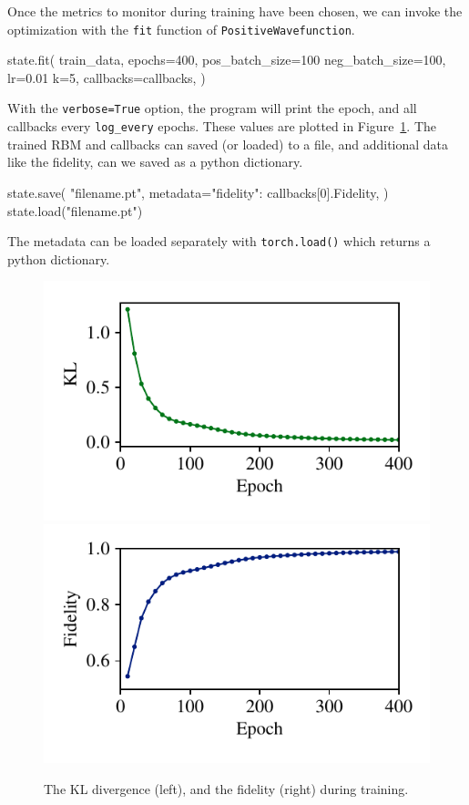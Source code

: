 \documentclass[submission, Phys]{SciPost}
\begin{document}
Once the metrics to monitor during training have been chosen, we can invoke the optimization with the \verb|fit| function of \verb|PositiveWavefunction|.


\begin{python}
state.fit(
    train_data,
    epochs=400,
    pos_batch_size=100
    neg_batch_size=100,
    lr=0.01
    k=5,
    callbacks=callbacks,
)
\end{python}

With the \verb|verbose=True| option, the program will print the epoch, and all callbacks every \verb|log_every| epochs. These values are plotted in Figure~\ref{fig:KL}. 
The trained RBM and callbacks can saved (or loaded) to a file, and additional data like the fidelity, can we saved as a python dictionary.
\begin{python}
state.save(
    "filename.pt",
    metadata={"fidelity": callbacks[0].Fidelity},
)
state.load("filename.pt")
\end{python}

The metadata can be loaded separately with \verb|torch.load()| which returns a python dictionary.


\begin{figure}[]
    \centering
    \includegraphics[width=0.48\linewidth, trim={10 14 10 10}, clip]{plots/KL.pdf}
    \includegraphics[width=0.48\linewidth, trim={10 14 10 10}, clip]{plots/fid.pdf}
    \caption{The KL divergence (left), and the fidelity (right) during training.
    }
    \label{fig:KL}
\end{figure}

\end{document}
